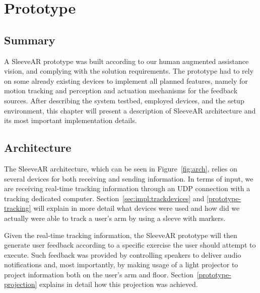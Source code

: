 \chapter{Prototype}
\label{sec:implementation}

\section*{Summary}
A SleeveAR prototype was built according to our human augmented assistance vision, and complying with the solution requirements.
The prototype had to rely on some already existing devices to implement all planned features, namely for motion tracking and perception and actuation mechanisms for the feedback sources. After describing the system testbed, employed devices, and the setup environment, this chapter will present a description of SleeveAR architecture and its most important implementation details.

\section{Architecture}
\label{sec:impl:arch}

The SleeveAR architecture, which can be seen in Figure~\ref{fig:arch}, relies on several devices for both receiving and sending information.
In terms of input, we are receiving real-time tracking information through an UDP connection with a tracking dedicated computer. Section~\ref{sec:impl:trackdevices} and \ref{prototype-tracking} will explain in more detail what devices were used and how did we actually were able to track a user's arm by using a sleeve with markers.

Given the real-time tracking information, the SleeveAR prototype will then generate user feedback according to a specific exercise the user should attempt to execute. Such feedback was provided by controlling speakers to deliver audio notifications and, most importantly, by making usage of a light projector to project information both on the user's arm and floor. Section~\ref{prototype-projection} explains in detail how this projection was achieved.


